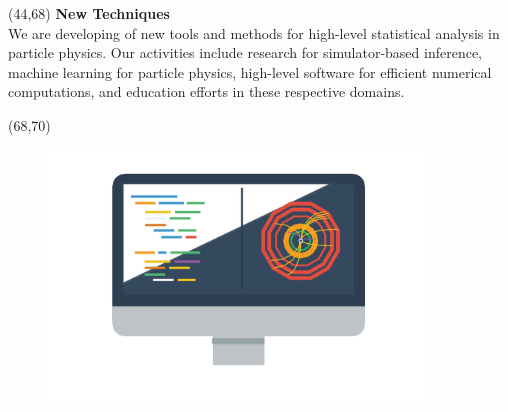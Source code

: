 \documentclass[final]{beamer}
\begin{document}
\begin{frame}{}
\begin{textblock}{23}(44,68)
\textcolor{mybluelabel}{\bf New Techniques} \\
We are developing of new tools and methods for
high-level statistical analysis in particle physics. Our activities
include research for simulator-based inference, machine learning for
particle physics, high-level software for efficient numerical
computations, and education efforts in these respective domains.
\end{textblock}

\begin{textblock}{12.0}(68,70)
\begin{figure}[tbph]
\centering
\includegraphics[width=0.9\textwidth]{images/better-software.jpg}
\end{figure}
\end{textblock}








\end{frame}
\end{document}
